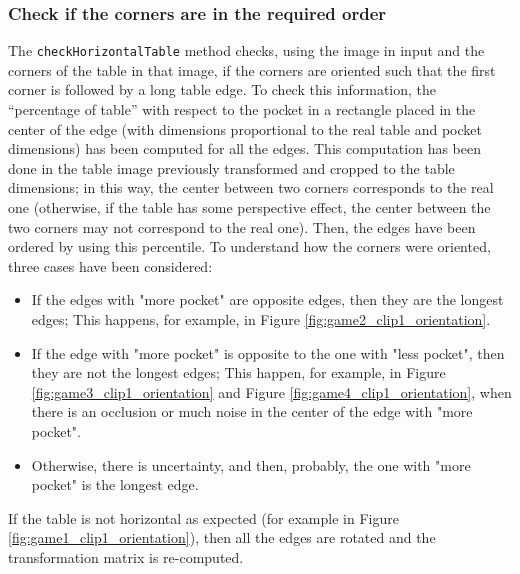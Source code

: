 \subsubsection{Check if the corners are in the required order}
The \texttt{checkHorizontalTable} method checks, using the image in input and the corners of the table in that image, if the corners are oriented such that the first corner is followed by a long table edge.
To check this information, the “percentage of table” with respect to the pocket in a rectangle placed in the center of the edge (with dimensions proportional to the real table and pocket dimensions) has been computed for all the edges. This computation has been done in the table image previously transformed and cropped to the table dimensions; in this way, the center between two corners corresponds to the real one (otherwise, if the table has some perspective effect, the center between the two corners may not correspond to the real one). Then, the edges have been ordered by using this percentile. To understand how the corners were oriented, three cases have been considered:
\begin{itemize}
	\item If the edges with "more pocket" are opposite edges, then they are the longest edges; This happens, for example, in Figure \ref{fig:game2_clip1_orientation}.
	\item If the edge with "more pocket" is opposite to the one with "less pocket", then they are not the longest edges; This happen, for example, in Figure \ref{fig:game3_clip1_orientation} and Figure \ref{fig:game4_clip1_orientation}, when there is an occlusion or much noise in the center of the edge with "more pocket".
	\item Otherwise, there is uncertainty, and then, probably, the one with "more pocket" is the longest edge.
\end{itemize}
If the table is not horizontal as expected (for example in Figure \ref{fig:game1_clip1_orientation}), then all the edges are rotated and the transformation matrix is re-computed.

